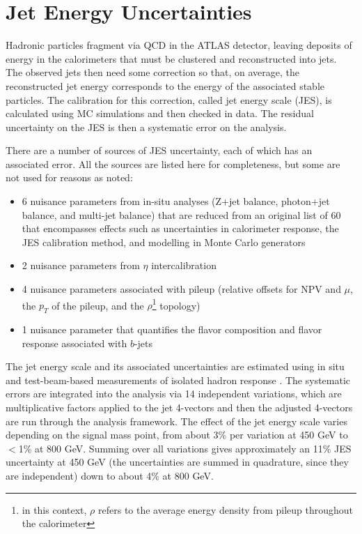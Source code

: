 \section{Jet Energy Uncertainties} 
\label{sec:jes}
Hadronic particles fragment via QCD in the ATLAS detector, leaving deposits of 
energy in the calorimeters that must be clustered and reconstructed into jets.  The
observed jets then need some correction so that, on average, the reconstructed
jet energy corresponds to the energy of the associated stable particles.  The
calibration for this correction, called jet energy scale (JES), is calculated using MC simulations and then checked
in data.  The residual uncertainty on the JES is then a systematic 
error on the analysis.

There are a number of sources of JES uncertainty, each of which has an associated error.
All the sources are listed here for completeness, but some are not used for reasons
as noted:
\begin{itemize}
    \item 6 nuisance parameters from in-situ analyses (Z+jet balance, photon+jet balance, and
    multi-jet balance) that are reduced from an original list of 60 that encompasses effects
    such as uncertainties in calorimeter response, the JES calibration method, and modelling
    in Monte Carlo generators
    \item 2 nuisance parameters from $\eta$ intercalibration
    \item 4 nuisance parameters associated with pileup (relative offsets for NPV and $\mu$,
    the $p_T$ of the pileup, and the $\rho$\footnote{in this context, $\rho$ refers to the average energy
    density from pileup throughout the calorimeter} topology)
    \item 1 nuisance parameter that quantifies the flavor composition and flavor
    response associated with $b$-jets
\end{itemize} 

The jet energy scale and its associated uncertainties are estimated using
in situ and test-beam-based measurements of isolated hadron response \cite{jes}.  The systematic
errors are integrated into the analysis via 14 independent variations, which are multiplicative factors applied to the jet
4-vectors and then the adjusted 4-vectors are run through the analysis framework.
The effect of the jet energy scale varies depending on the signal mass
point, from about 3\% per variation at 450 GeV to $<$1\% at 800 GeV.  Summing over
all variations gives approximately an 11\% JES uncertainty at 450 GeV (the uncertainties
are summed in quadrature, since they are independent) down to about 4\% at 800 GeV.

